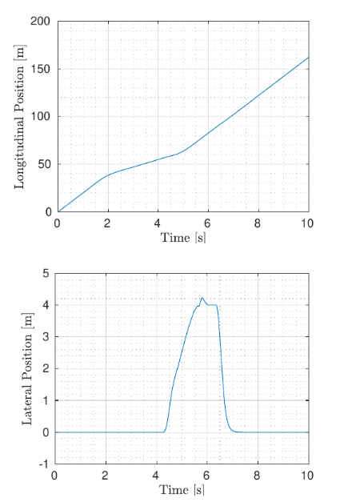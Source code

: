 \begin{figure}[!t] %
	\begin{minipage}[t]{0.5\textwidth}
		\includegraphics[width=\textwidth]{./figure/three_obstacles_no_overtaking/LongitudinalPositionVsTime.pdf}
		\subcaption{}\label{fig:longitudinal_braking}
	\end{minipage}
	\begin{minipage}[t]{0.5\textwidth}
		\includegraphics[width=\textwidth]{./figure/three_obstacles_no_overtaking/LateralPositionVsTime.pdf}
		\subcaption{}\label{fig:lateral_braking}
	\end{minipage}
	\begin{minipage}[t]{0.5\textwidth}

\end{minipage}
\end{figure}
